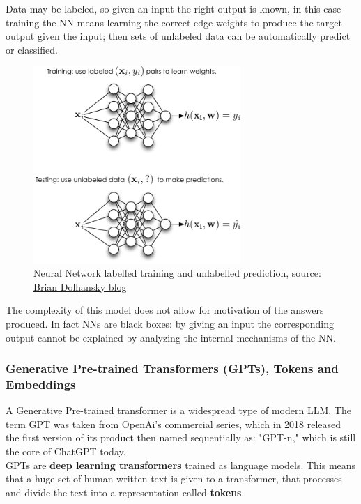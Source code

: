 \documentclass[12pt]{article}
\begin{document}
Data may be labeled, so given an input the right output is known, in this case training the NN means learning the correct edge weights to produce the target output given the input; then sets of unlabeled data can be automatically predict or classified.
    \begin{figure}[H]
    \centering
            \includegraphics[width=0.7\textwidth]{trainingNN.png}
    \caption{Neural Network labelled training and unlabelled prediction, source: \href{https://www.briandolhansky.com/blog/artificial-neural-networks-linear-regression-part-1}{Brian Dolhansky blog}}
    \end{figure}

The complexity of this model does not allow for motivation of the answers produced. In fact NNs are black boxes: by giving an input the corresponding output cannot be explained by analyzing the internal mechanisms of the NN.


        \subsubsection{Generative Pre-trained Transformers (GPTs), Tokens and Embeddings}
A Generative Pre-trained transformer is a widespread type of modern LLM. The term GPT was taken from OpenAi's commercial series, which in 2018 released the first version of its product then named sequentially as: "GPT-n," which is still the core of ChatGPT today.\\
GPTs are \textbf{deep learning transformers} trained as language models. This means that a huge set of human written text is given to a transformer, that processes and divide the text into a representation called \textbf{tokens}.\\
\end{document}
